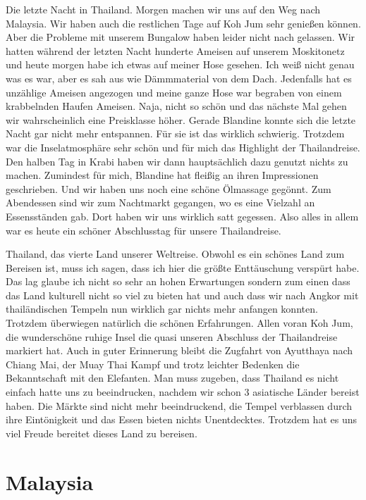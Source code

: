 \documentclass[11pt]{book}
\begin{document}
Die letzte Nacht in Thailand. Morgen machen wir uns auf den Weg nach Malaysia. Wir haben auch die restlichen Tage auf Koh Jum 
sehr genießen können. Aber die Probleme mit unserem Bungalow haben leider nicht nach gelassen. Wir hatten während der letzten Nacht 
hunderte Ameisen auf unserem Moskitonetz und heute morgen habe ich etwas auf meiner Hose gesehen. Ich weiß nicht genau was es war, aber
es sah aus wie Dämmmaterial von dem Dach. Jedenfalls hat es unzählige Ameisen angezogen und meine ganze Hose war begraben von einem 
krabbelnden Haufen Ameisen. Naja, nicht so schön und das nächste Mal gehen wir wahrscheinlich eine Preisklasse höher. Gerade Blandine 
konnte sich die letzte Nacht gar nicht mehr entspannen. Für sie ist das wirklich schwierig. Trotzdem war die Inselatmosphäre sehr schön 
und für mich das Highlight der Thailandreise. 
Den halben Tag in Krabi haben wir dann hauptsächlich dazu genutzt nichts zu machen. Zumindest für mich, Blandine hat fleißig an 
ihren Impressionen geschrieben. Und wir haben uns noch eine schöne Ölmassage gegönnt. Zum Abendessen sind wir zum Nachtmarkt gegangen, 
wo es eine Vielzahl an Essensständen gab. Dort haben wir uns wirklich satt gegessen. Also alles in allem war es heute ein schöner 
Abschlusstag für unsere Thailandreise.


Thailand, das vierte Land unserer Weltreise. Obwohl es ein schönes Land zum Bereisen ist, muss ich sagen, dass ich hier 
die größte Enttäuschung verspürt habe. Das lag glaube ich nicht so sehr an hohen Erwartungen sondern zum einen dass das Land 
kulturell nicht so viel zu bieten hat und auch dass wir nach Angkor mit thailändischen Tempeln nun wirklich gar nichts mehr anfangen 
konnten. Trotzdem überwiegen natürlich die schönen Erfahrungen. Allen voran Koh Jum, die wunderschöne ruhige Insel die quasi unseren 
Abschluss der Thailandreise markiert hat. Auch in guter Erinnerung bleibt die Zugfahrt von Ayutthaya nach Chiang Mai, der Muay Thai 
Kampf und trotz leichter Bedenken die Bekanntschaft mit den Elefanten. Man muss zugeben, dass Thailand es nicht einfach hatte uns 
zu beeindrucken, nachdem wir schon 3 asiatische Länder bereist haben. Die Märkte sind nicht mehr beeindruckend, die Tempel verblassen 
durch ihre Eintönigkeit und das Essen bieten nichts Unentdecktes. Trotzdem hat es uns viel Freude bereitet dieses Land zu bereisen.



\chapter{Malaysia}
\end{document}
